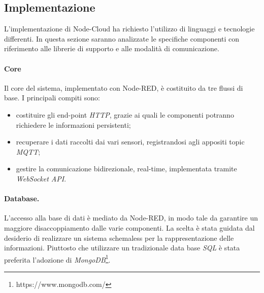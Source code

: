\documentclass{article}
\begin{document}
\subsection{Implementazione}
L’implementazione di Node-Cloud ha richiesto l’utilizzo di linguaggi e tecnologie differenti. In questa sezione saranno analizzate le specifiche componenti con riferimento alle librerie di supporto e alle modalità di comunicazione.
\paragraph{Core}
Il core del sistema, implementato con Node-RED, è costituito da tre flussi di base. I principali compiti sono:
\begin{itemize}
    \item costituire gli end-point \emph{HTTP}, grazie ai quali le componenti potranno richiedere le informazioni persistenti;
    \item recuperare i dati raccolti dai vari sensori, registrandosi agli appositi topic \emph{MQTT};
    \item gestire la comunicazione bidirezionale, real-time, implementata tramite \emph{WebSocket API}.
\end{itemize}
\paragraph{Database.}
L’accesso alla base di dati è mediato da Node-RED, in modo tale da garantire un maggiore disaccoppiamento dalle varie componenti. La scelta è stata guidata dal desiderio di realizzare un sistema schemaless per la rappresentazione delle informazioni. Piuttosto che utilizzare un tradizionale data base \emph{SQL} è stata preferita l’adozione di \emph{MongoDB}\footnote{https://www.mongodb.com/}.
\end{document}
